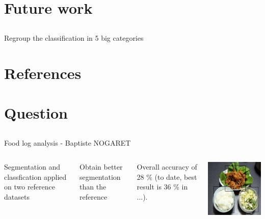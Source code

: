 \documentclass[aspectratio=169]{beamer}
\let\oldsection\section
\renewcommand{\section}[1]{
    \oldsection{#1}	
    \subsection{}
}
\newenvironment{myframe}[1][t]{\begin{frame}[#1]{\secname}{\subsecname}}{\end{frame}}
\begin{document}
    \section{Future work}
    
    \begin{myframe}
        Regroup the classification in 5 big categories
    \end{myframe}
    
    \section{References}
    
    \begin{myframe}[t, allowframebreaks]
        \printbibliography[heading=none]
    \end{myframe}
    
    \section{Question}
    
    {
        \begin{frame}{Food log analysis - Baptiste NOGARET}{}
            \begin{columns}
                
                Segmentation and classfication applied on two reference datasets
                
                Obtain better segmentation than the reference
                
                Overall accuracy of 28 \% (to date, best result is 36 \% in ...).
                
                \includegraphics[width=\textwidth]{../img/seg_97_gt}
            \end{columns}
        \end{frame}
    }
   
\end{document}
